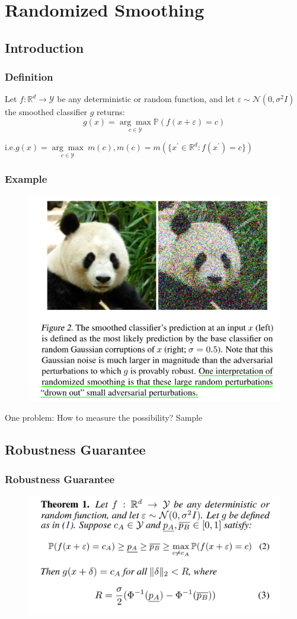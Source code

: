 \documentclass[aspectratio=169%
,serif,mathserif]{beamer}
\begin{document}
\section{Randomized Smoothing}
\subsection{Introduction}
\begin{frame}
	\frametitle{Definition}
	\begin{definition}
		Let $f: \mathbb{R}^d \to \mathcal{Y}$  be any deterministic or random function, and let 
		$ \varepsilon \sim  \mathcal{N}(0, \sigma^2 I)$ the smoothed classifier $g$ returns:
		\begin{equation}
			g(x)=\underset{c \in \mathcal{Y}}{\arg \max } \mathbb{P}(f(x+\varepsilon)=c)
		\end{equation}
	\end{definition}
	i.e.$g(x) = \underset{c \in \mathcal{Y}}{\arg \max}~m(c), m(c)= m(\{x^{\prime} \in \mathbb{R}^{d}: f(x^{\prime})=c\})$
\end{frame}

\begin{frame}
	\frametitle{Example}
	\begin{figure}[htbp]
		\includegraphics[width=0.4\linewidth]{1.png}
	\end{figure}
	One problem: How to measure the possibility? Sample
\end{frame}

\subsection{Robustness Guarantee}
\begin{frame}
	\frametitle{Robustness Guarantee}
	\begin{figure}
		\includegraphics[width=0.4\linewidth]{2.png}
	\end{figure}
\end{frame}
\end{document}
